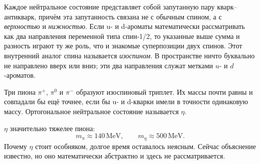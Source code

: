Каждое нейтральное состояние представляет собой запутанную пару кварк--антикварк, причём эта запутанность связана не с обычным спином, а с \emph{верхностью} и \emph{нижностью}. Если u- и d-ароматы математически рассматривать как два направления переменной типа спин-1/2, то указанные выше сумма и разность играют ту же роль, что и знакомые суперпозиции двух спинов. Этот внутренний аналог спина называется \emph{изоспином}. В пространстве ничто буквально не направлено вверх или вниз; эти два направления служат метками \(u\)- и \(d\)-ароматов.

Три пиона \(\pi^+\), \(\pi^0\) и \(\pi^-\) образуют изоспиновый триплет. Их массы почти равны и совпадали бы ещё точнее, если бы u- и d-кварки имели в точности одинаковую массу. Ортогональное нейтральное состояние называется \(\eta\).

\(\eta\) значительно тяжелее пиона:
\begin{equation}
m_\pi \approx 140\,\mathrm{MeV},
\qquad
m_\eta \approx 500\,\mathrm{MeV}.
\end{equation}
Почему \(\eta\) стоит особняком, долгое время оставалось неясным. Сейчас объяснение известно, но оно математически абстрактно и здесь не рассматривается.

\begin{classroomqa}
\end{classroomqa}

\begin{classroomqa}
\end{classroomqa}

\begin{classroomqa}
\end{classroomqa}

